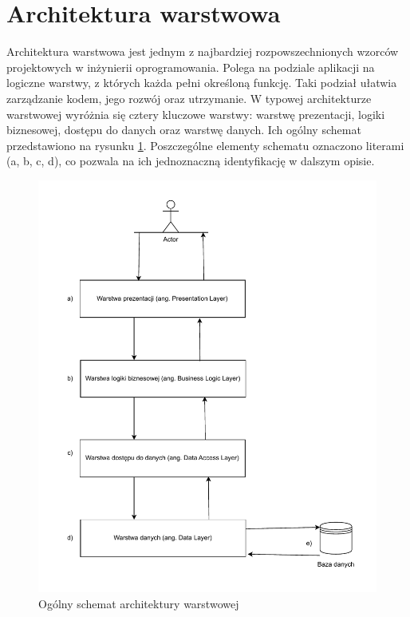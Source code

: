 \section{Architektura warstwowa}

Architektura warstwowa jest jednym z najbardziej rozpowszechnionych wzorców projektowych w inżynierii oprogramowania. Polega na podziale aplikacji na logiczne warstwy, z których każda pełni określoną funkcję. Taki podział ułatwia zarządzanie kodem, jego rozwój oraz utrzymanie. W typowej architekturze warstwowej wyróżnia się cztery kluczowe warstwy: warstwę prezentacji, logiki biznesowej, dostępu do danych oraz warstwę danych. Ich ogólny schemat przedstawiono na rysunku \ref{fig:n_tier_arch}. Poszczególne elementy schematu oznaczono literami (a, b, c, d), co pozwala na ich jednoznaczną identyfikację w dalszym opisie.

\begin{figure}[ht]
    \centering
    \includegraphics[width=.9\linewidth]{rys03/diagram_architektury_warstwowej}
    \caption{Ogólny schemat architektury warstwowej}
    \label{fig:n_tier_arch}
\end{figure}

